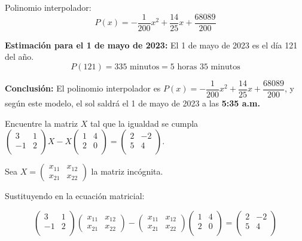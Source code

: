 \begin{prob}
\begin{myproof}
Polinomio interpolador:
\[
P(x) = -\frac{1}{200}x^2 + \frac{14}{25}x + \frac{68089}{200}
\]


\textbf{Estimación para el 1 de mayo de 2023:} El 1 de mayo de 2023 es el día 121 del año.
\[
P(121) = 335 \text{ minutos} = 5 \text{ horas } 35 \text{ minutos}
\]

\textbf{Conclusión:}
El polinomio interpolador es \( P(x) = -\dfrac{1}{200}x^2 + \dfrac{14}{25}x + \dfrac{68089}{200} \), y según este modelo, el sol saldrá el 1 de mayo de 2023 a las \textbf{5:35 a.m.}
\end{myproof}

\end{prob}



\begin{prob}
Encuentre la matriz $X$ tal que la igualdad se cumpla $\left( \begin{array}{cc}
3&1\\
-1&2\\ \end{array} \right) X-X\left( \begin{array}{cc}
1&4\\
2&0\\ \end{array} \right)= \left( \begin{array}{cc}
2&-2\\
5&4\\ \end{array} \right).$

\begin{myproof}
Sea $X = \left( \begin{array}{cc} x_{11} & x_{12} \\ x_{21} & x_{22} \end{array} \right)$ la matriz incógnita.

Sustituyendo en la ecuación matricial:

$$\left( \begin{array}{cc}
3&1\\
-1&2\\ \end{array} \right) \left( \begin{array}{cc} x_{11} & x_{12} \\ x_{21} & x_{22} \end{array} \right) - \left( \begin{array}{cc} x_{11} & x_{12} \\ x_{21} & x_{22} \end{array} \right) \left( \begin{array}{cc}
1&4\\
2&0\\ \end{array} \right) = \left( \begin{array}{cc}
2&-2\\
5&4\\ \end{array} \right)$$


\end{myproof}
\end{prob}
